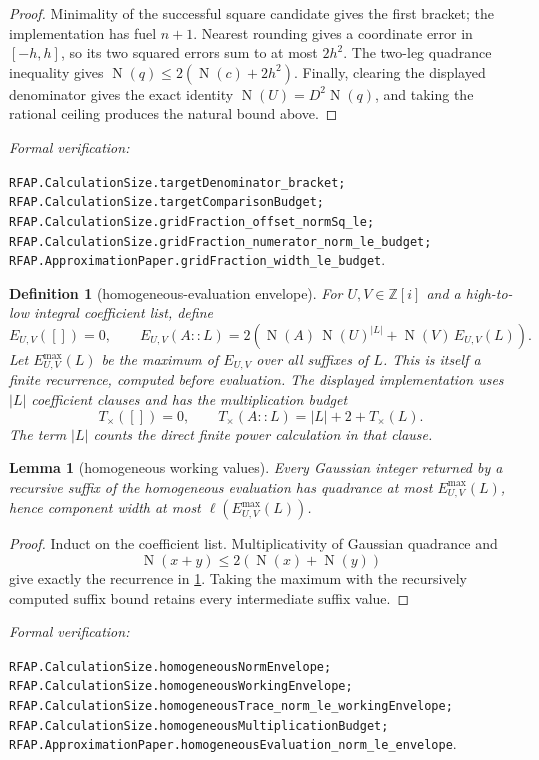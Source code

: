 \documentclass[11pt]{article}
\newtheorem{lemma}[lemma]{Lemma}
\newtheorem{definition}[definition]{Definition}
\newcommand{\Zi}{\mathbb{Z}[i]}
\newcommand{\Norm}[1]{\operatorname{N}\!\left(#1\right)}
\newcommand{\leanref}[1]{\par\smallskip\noindent
  \emph{Formal verification:}\par\nobreak
  {\raggedright\nolinkurl{#1}.\par}}
\begin{document}
\begin{proof}
Minimality of the successful square candidate gives the first bracket; the
implementation has fuel $n+1$.  Nearest rounding gives a coordinate error in
$[-h,h]$, so its two squared errors sum to at most $2h^2$.  The two-leg
quadrance inequality gives
$\Norm q\le2(\Norm c+2h^2)$.  Finally, clearing the displayed denominator
gives the exact identity $\Norm U=D^2\Norm q$, and taking the rational ceiling
produces the natural bound above.
\end{proof}

\leanref{RFAP.CalculationSize.targetDenominator_bracket;
RFAP.CalculationSize.targetComparisonBudget;
RFAP.CalculationSize.gridFraction_offset_normSq_le;
RFAP.CalculationSize.gridFraction_numerator_norm_le_budget;
RFAP.ApproximationPaper.gridFraction_width_le_budget}

\begin{definition}[homogeneous-evaluation envelope]
\label{def:homogeneous-envelope}
For $U,V\in\Zi$ and a high-to-low integral coefficient list, define
\[
 E_{U,V}([])=0,\qquad
 E_{U,V}(A::L)=2\left(
    \Norm A\,\Norm U^{|L|}+\Norm V\,E_{U,V}(L)\right).
\]
Let $E^{\max}_{U,V}(L)$ be the maximum of $E_{U,V}$ over all suffixes of
$L$.  This is itself a finite recurrence, computed before evaluation.
The displayed implementation uses $|L|$ coefficient clauses and has the
multiplication budget
\[
 T_{\times}([])=0,\qquad
 T_{\times}(A::L)=|L|+2+T_{\times}(L).
\]
The term $|L|$ counts the direct finite power calculation in that clause.
\end{definition}

\begin{lemma}[homogeneous working values]
\label{lem:homogeneous-envelope}
Every Gaussian integer returned by a recursive suffix of the homogeneous
evaluation has quadrance at most $E^{\max}_{U,V}(L)$, hence component width at
most $\ell(E^{\max}_{U,V}(L))$.
\end{lemma}

\begin{proof}
Induct on the coefficient list.  Multiplicativity of Gaussian quadrance and
\[
                  \Norm{x+y}\le2(\Norm x+\Norm y)
\]
give exactly the recurrence in \cref{def:homogeneous-envelope}.  Taking the
maximum with the recursively computed suffix bound retains every intermediate
suffix value.
\end{proof}

\leanref{RFAP.CalculationSize.homogeneousNormEnvelope;
RFAP.CalculationSize.homogeneousWorkingEnvelope;
RFAP.CalculationSize.homogeneousTrace_norm_le_workingEnvelope;
RFAP.CalculationSize.homogeneousMultiplicationBudget;
RFAP.ApproximationPaper.homogeneousEvaluation_norm_le_envelope}
\end{document}
